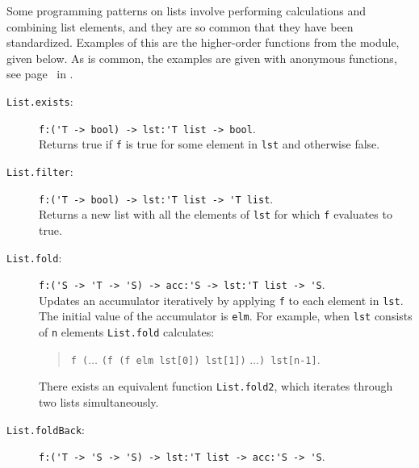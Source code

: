 \documentclass[fsharpNotes.tex]{subfiles}
\begin{document}
Some programming patterns on lists involve performing calculations and combining list elements, and they are so common that they have been standardized. Examples of this are the higher-order functions from the module, given below. As is common, the examples are given with anonymous functions, see page~\pageref{page:anonymousFunction} in .
\begin{description}
\item[\texttt{List.exists}:] \lstinline{f:('T -> bool) -> lst:'T list -> bool}.~\\
  Returns true if \lstinline{f} is true for some element in \lstinline{lst} and otherwise false.
\item[\texttt{List.filter}:] \lstinline{f:('T -> bool) -> lst:'T list -> 'T list}.~\\
  Returns a new list with all the elements of \lstinline{lst} for which \lstinline{f} evaluates to true.
\item[\texttt{List.fold}:] \lstinline{f:('S -> 'T -> 'S) -> acc:'S -> lst:'T list -> 'S}.~\\
  Updates an accumulator iteratively by applying \lstinline{f} to each element in \lstinline{lst}. The initial value of the accumulator is \lstinline{elm}. For example, when \lstinline{lst} consists of \lstinline{n} elements
  \lstinline{List.fold} calculates:
  \begin{quote}
    \lstinline{f (}$\ldots$ \lstinline{(f (f elm lst[0]) lst[1])} $\ldots$\lstinline{) lst[n-1]}.
  \end{quote}
  There exists an equivalent function \lstinline{List.fold2}, which iterates through two lists simultaneously.
\item[\texttt{List.foldBack}:] \lstinline{f:('T -> 'S -> 'S) -> lst:'T list -> acc:'S -> 'S}.~\\

\end{description}
\end{document}
